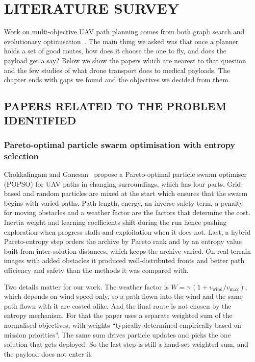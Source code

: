 
\chapter{LITERATURE SURVEY}\label{cha:lit}

Work on multi-objective UAV path planning comes from both graph search and evolutionary
optimisation~\cite{r11}. The main thing we asked was that once a planner holds a set of
good routes, how does it choose the one to fly, and does the payload get a say? Below we
show the papers which are nearest to that question and the few studies of what drone
transport does to medical payloads. The chapter ends with gaps we found and the
objectives we decided from them.

\section{PAPERS RELATED TO THE PROBLEM IDENTIFIED}\label{sec:lit-papers}

\subsection{Pareto-optimal particle swarm optimisation with entropy selection}

Chokkalingam and Ganesan~\cite{r1} propose a Pareto-optimal particle swarm optimiser
(POPSO) for UAV paths in changing surroundings, which has four parts. Grid-based and
random particles are mixed at the start which ensures that the swarm begins with varied
paths. Path length, energy, an inverse safety term, a penalty for moving obstacles and a
weather factor are the factors that determine the cost. Inertia weight and learning
coefficients shift during the run hence pushing exploration when progress stalls and
exploitation when it does not. Last, a hybrid Pareto-entropy step orders the archive by
Pareto rank and by an entropy value built from inter-solution distances, which keeps
the archive varied. On real terrain images with added obstacles it produced well-distributed fronts and
better path efficiency and safety than the methods it was compared with.

Two details matter for our work. The weather factor is
$W = \gamma\,(1 + v_\mathrm{wind}/v_\mathrm{max})$, which depends on wind speed only,
so a path flown into the wind and the same path flown with it are costed alike. And the
final route is not chosen by the entropy mechanism. For that the paper uses a separate
weighted sum of the normalised objectives, with weights ``typically determined
empirically based on mission priorities''. The same sum drives particle updates and
picks the one solution that gets deployed. So the last step is still
a hand-set weighted sum, and the payload does not enter it.

